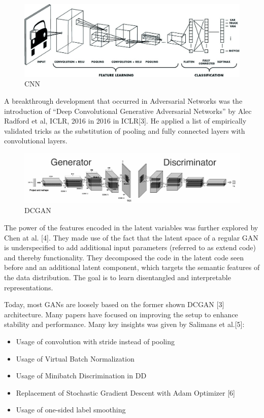 \begin{figure}[H]
\centering\includegraphics[width=.7\textwidth]{images/CNN.jpg}
\caption{CNN}
\end{figure}
A breakthrough development that occurred in Adversarial Networks was the introduction of “Deep Convolutional Generative Adversarial Networks” by Alec Radford et al, ICLR, 2016 in 2016 in ICLR[3]. He applied a list of empirically validated tricks as the substitution of pooling and fully connected layers with convolutional layers.\par\bigskip
\begin{figure}[H]
\centering\includegraphics[width=1\textwidth]{images/dcgan.png}
\caption{DCGAN}
\end{figure}
The power of the features encoded in the latent variables was further explored by Chen at al. [4]. They made use of the fact that the latent space of a regular GAN is underspecified to add additional input parameters (referred to as extend code) and thereby functionality. They decomposed the code in the latent code seen before and an additional latent component, which targets the semantic features of the data distribution. The goal is to learn disentangled and interpretable representations.\par\bigskip
Today, most GANs are loosely based on the former shown DCGAN [3] architecture. Many papers have focused on improving the setup to enhance stability and performance. Many key insights was given by Salimans et al.[5]:
\begin{itemize}
\item Usage of convolution with stride instead of pooling
\item Usage of Virtual Batch Normalization
\item Usage of Minibatch Discrimination in DD
\item Replacement of Stochastic Gradient Descent with Adam Optimizer [6]
\item Usage of one-sided label smoothing
\end{itemize}
